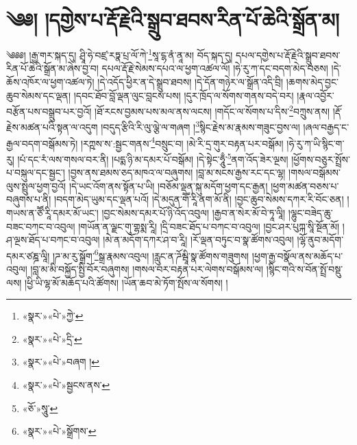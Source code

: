 \chapter{༄༅། །དགྱེས་པ་རྡོ་རྗེའི་སྒྲུབ་ཐབས་རིན་པོ་ཆེའི་སྒྲོན་མ།}༄༅༅། །རྒྱ་གར་སྐད་དུ། ཤྲཱི་ཧེ་བཛྲ་རཏྣ་པྲ་ལོ་ཀེ་\footnote{«སྣར་»«པེ་»ཀྱེ་}སཱ་ངྷ་ནཾ་ནཱ་མ། བོད་སྐད་དུ། དཔལ་དགྱེས་པ་རྡོ་རྗེའི་སྒྲུབ་ཐབས་རིན་པོ་ཆེའི་སྒྲོན་མ་ཞེས་བྱ་བ། དཔལ་རྡོ་རྗེ་སེམས་དཔའ་ལ་ཕྱག་འཚལ་ལོ། །ཧེ་རུ་ཀ་དང་བདག་མེད་བཅས། །དེ་ཆོས་འཁོར་ལ་ཕྱག་འཚལ་ཏེ། །དེ་འདོད་ཕྱིར་ན་དེ་སྒྲུབ་ཐབས། །དེ་དོན་གཉེར་ལ་སྒྲོན་འདི་བྲི། །ཆགས་མེད་བྱང་ཆུབ་སེམས་དང་ལྡན། །དབང་ཐོབ་བློ་ལྡན་ལུང་བླངས་པས། །དུར་ཁྲོད་ལ་སོགས་གནས་བདེ་བར། །རྣལ་འབྱོར་བརྩོན་པས་བསྒྲུབ་པར་བྱའོ། །ཐོ་རངས་བྱམས་པས་མལ་ནས་ལངས། །གདོང་ལ་སོགས་པ་དིས་\footnote{«སྣར་»«པེ་»དྲི་}བཀྲུས་ནས། །རྡོ་རྗེས་མཚན་པའི་སྟན་ལ་འདུག །བདུད་རྩིའི་རི་ལུ་ལྕེ་ལ་གཞག །\footnote{«སྣར་»«པེ་»བཞག །}སྙིང་རྗེས་མ་རྣམས་གཟུང་བྱས་ལ། །ཞལ་བརྒྱད་ང་རྒྱལ་བདག་བསྒོམས་ཏེ། །རཀྵས་ས་:སྦྱང་གནས་\footnote{«སྣར་»«པེ་»སྦྱངས་ནས་}བསྲུང་བ། །མེ་རི་དྲ་གུར་བརྟན་པར་བསྒོམ། །ཧེ་རུ་ཀ་ཡི་སྙིང་ག་རུ། །པཾ་དང་རཾ་ལས་གསལ་བར་ནི། །པདྨ་ཉི་མ་དམར་པོ་བསྒོམ། །དེ་སྟེང་ཧཱུྃ་\footnote{«ཅོ་»སཱུ་}ནག་འོད་ཟེར་ལྔས། །ཕྱོགས་བཅུར་སྤྲོས་པ་བསྐུལ་དང་སྦྱང་། །བྱས་ནས་ཐམས་ཅད་མཁའ་ལ་བཞུགས། །བླ་མ་སངས་རྒྱས་རང་དང་ལྷ། །གསལ་བསྒོམས་ལུས་སྤྲུལ་ཕྱག་བྱའོ། །དེ་ཡང་འོག་ནས་སྟོན་པ་ཡི། །བཅོམ་ལྡན་སྐུ་མདོག་ཕྱག་དང་རྒྱན། །ཕྱག་མཚན་བཅས་པ་བཞུགས་པ་ནི། །བདག་མེད་ཡུམ་དང་ལྡན་པའོ། །དེ་མདུན་གཽ་རཱི་ནག་མོ་ནི། །བྱང་ཆུབ་སེམས་དཀར་རི་བོང་ཅན། །གཡས་ན་ཙཽ་རཱི་དམར་མོ་ཡང་། །བྱང་སེམས་དམར་པོ་ཉི་འོད་འབུལ། །རྒྱབ་ན་སེར་མོ་བེ་ཏཱ་ལཱི། །ལྷུང་བཟེད་ཆུ་བཟང་བཀང་བ་འབུལ། །གཡོན་ན་ལྗང་གུ་གྷསྨ་རཱི། །དྲི་བཟང་ཐོད་པ་བཀང་བ་འབུལ། །བྱང་ཤར་པུཀྐ་སཱི་སྔོན་མོ། །ཤ་ལྔས་ཐོད་པ་བཀང་བ་འབུལ། །མེ་ན་མདོག་དཀར་ཤ་བ་རཱི། །རོ་ལྡན་བཏུང་བ་སྣ་ཚོགས་འབུལ། །ལྷོ་ནུབ་མདོག་དམར་ཙཎྜ་ལཱི། །ཌ་མ་རུ་སྒྲོག་\footnote{«སྣར་»«པེ་»སྒྲོགས་}སྒྲ་རྣམས་འབུལ། །རླུང་ན་ཌོམྦཱི་སྣ་ཚོགས་གཟུགས། །ཕྱག་རྒྱ་བསྣོལ་ནས་མཆོད་པ་འབུལ། །བླ་མ་མི་བསྐྱོད་སྤྱི་བོར་བཞུགས། །གསལ་བར་བརྟན་པར་ལེགས་བསྒོམས་ལ། །སྙིང་གའི་ས་བོན་སྤྲོ་བསྡུ་ལས། །ཕྱི་ཡི་ལྷ་མོ་མཆོད་པའི་ཚོགས། །ཡོན་ཆབ་མེ་ཏོག་སྤོས་ལ་སོགས། །
